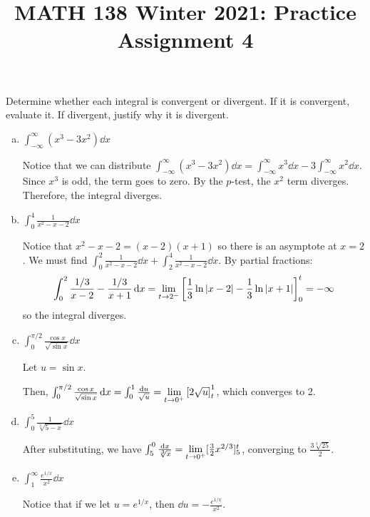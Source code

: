 \documentclass{agony}
\title{MATH 138 Winter 2021: Practice Assignment 4}
\begin{document}
\begin{prob}
  Determine whether each integral is convergent or divergent.
  If it is convergent, evaluate it.
  If divergent, justify why it is divergent.
\end{prob}
\begin{enumerate}[(a)]
  \item $\int_{-\infty}^\infty(x^3-3x^2) \dd{x}$
        \begin{sol}
          Notice that we can distribute
          $\int_{-\infty}^\infty(x^3-3x^2) \dd{x} = \int_{-\infty}^\infty x^3 \dd{x} - 3\int_{-\infty}^\infty x^2 \dd{x}$.
          Since $x^3$ is odd, the term goes to zero.
          By the $p$-test, the $x^2$ term diverges.
          Therefore, the integral diverges.
        \end{sol}
  \item $\int_0^4 \frac{1}{x^2-x-2} \dd{x}$
        \begin{sol}
          Notice that $x^2 - x - 2 = (x-2)(x+1)$ so there is an asymptote at $x=2$.
          We must find $\int_0^2 \frac{1}{x^2-x-2} \dd{x} + \int_2^4 \frac{1}{x^2-x-2} \dd{x}$.
          By partial fractions:
          \[ \int_0^2 \frac{1/3}{x-2} - \frac{1/3}{x+1} \dd{x} = \lim_{t\to2^-} \qty[\frac13 \ln|x-2| - \frac13 \ln|x+1|]_0^t = -\infty \]
          so the integral diverges.
        \end{sol}
  \item $\int_0^{\pi/2} \frac{\cos x}{\sqrt{\sin x}} \dd{x}$
        \begin{sol}
          Let $u = \sin x$.

          Then, $\int_0^{\pi/2} \frac{\cos x}{\sqrt{\sin x}} \dd{x}
            = \int_0^1 \frac{\dd{u}}{\sqrt{u}}
            = \lim\limits_{t\to0^+} \qty[2\sqrt{u}]_t^1$,
          which converges to 2.
        \end{sol}
  \item $\int_0^5 \frac{1}{\sqrt[3]{5-x}} \dd{x}$
        \begin{sol}
          After substituting, we have $\int_5^0 \frac{\dd x}{\sqrt[3]{x}}
            = \lim\limits_{t\to0^+} [\frac32 x^{2/3}]_5^t$,
          converging to $\frac{3\sqrt[3]{25}}{2}$.
        \end{sol}
  \item $\int_1^\infty \frac{e^{1/x}}{x^2} \dd{x}$
        \begin{sol}
          Notice that if we let $u = e^{1/x}$, then $\dd{u} = -\frac{e^{1/x}}{x^2}$.


\end{sol}
\end{enumerate}
\end{document}
